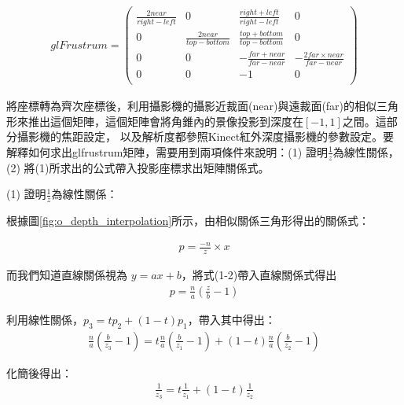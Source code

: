 	
	
	\begin{align}
	glFrustrum = \left(
		 			\begin{array}{cccc}
		 			\frac{2near}{right - left} & 0 & \frac{right + left}{right - left} & 0 \\
		 			0 & \frac{2near}{top - bottom} & \frac{top + bottom}{top - bottom} & 0 \\
		 			0 & 0 & -\frac{far + near}{far - near}  & -\frac{2far \times near}{far - near} \\
		 			0 & 0 & -1 & 0 \\
		 			\end{array}
		 		\right)
	\end{align}
	
	                    
	將座標轉為齊次座標後，利用攝影機的攝影近裁面(near)與遠裁面(far)的相似三角形來推出這個矩陣，這個矩陣會將角錐內的景像投影到深度在$[-1,1]$之間。這部分攝影機的焦距設定，
	以及解析度都參照Kinect紅外深度攝影機的參數設定。要解釋如何求出glfrustrum矩陣，需要用到兩項條件來說明：(1) 證明$\frac{1}{z}$為線性關係，
	(2) 將(1)所求出的公式帶入投影座標求出矩陣關係式。
	
	(1) 證明$\frac{1}{z}$為線性關係：
	
	根據圖\ref{fig:o_depth_interpolation}所示，由相似關係三角形得出的關係式：
	
	\begin{align}
		p = \frac{-n}{z} \times x		 		
	\end{align}
	
	而我們知道直線關係視為 $y = ax + b$，將式(1-2)帶入直線關係式得出	
	\begin{align}
		p = \frac{n}{a} (\frac{z}{b} - 1)
	\end{align}
	
	利用線性關係，$p_3 = tp_2 +(1-t)p_1$，帶入其中得出：	
	\begin{align}
		\frac{n}{a} (\frac{b}{z_3} - 1) = t \frac{n}{a} ( \frac{b}{z_1} - 1) + (1-t)\frac{n}{a} (\frac{b}{z_2} - 1)
	\end{align}
	
	化簡後得出：
	\begin{align}
		\frac{1}{z_3} = t \frac{1}{z_1}  + (1-t)\frac{1}{z_2} 
	\end{align}
	
%	
%	
	
